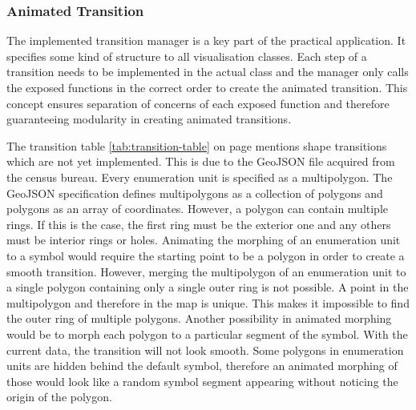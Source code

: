 \subsubsection{Animated Transition}
The implemented transition manager is a key part of the practical application. It specifies some kind of structure to all visualisation classes. Each step of a transition needs to be implemented in the actual class and the manager only calls the exposed functions in the correct order to create the animated transition. This concept ensures separation of concerns of each exposed function and therefore guaranteeing modularity in creating animated transitions.

The transition table \ref{tab:transition-table} on page \pageref{tab:transition-table} mentions shape transitions which are not yet implemented. This is due to the GeoJSON file acquired from the census bureau. Every enumeration unit is specified as a multipolygon. The GeoJSON specification defines multipolygons as a collection of polygons and polygons as an array of coordinates. However, a polygon can contain multiple rings. If this is the case, the first ring must be the exterior one and any others must be interior rings or holes.
Animating the morphing of an enumeration unit to a symbol would require the starting point to be a polygon in order to create a smooth transition. However, merging the multipolygon of an enumeration unit to a single polygon containing only a single outer ring is not possible. A point in the multipolygon and therefore in the map is unique. This makes it impossible to find the outer ring of multiple polygons.
Another possibility in animated morphing would be to morph each polygon to a particular segment of the symbol. With the current data, the transition will not look smooth. Some polygons in enumeration units are hidden behind the default symbol, therefore an animated morphing of those would look like a random symbol segment appearing without noticing the origin of the polygon.




